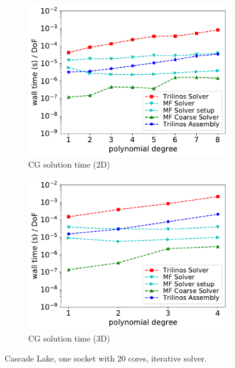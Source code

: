 \documentclass[AMA,STIX1COL]{WileyNJD-v2}
\begin{document}
\begin{figure}[!ht]
\begin{subfigure}[b]{0.49\textwidth}
    \includegraphics[width=\textwidth]{CSL_Munich_solver2d.pdf}
    \caption{CG solution time (2D)}
    \label{fig:benchmark_miehe_Emmy_sol2}
  \end{subfigure}
  \begin{subfigure}[b]{0.49\textwidth}
    \centering
    \includegraphics[width=\textwidth]{CSL_Munich_solver3d.pdf}
    \caption{CG solution time (3D)}
    \label{fig:benchmark_miehe_Emmy_sol3}
  \end{subfigure}
  \caption{Cascade Lake, one socket with 20 cores, iterative solver.}%
  \label{fig:benchmark_miehe_Emmy_cg}
\end{figure}
\end{document}
